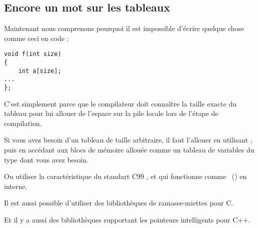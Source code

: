 \subsection{Encore un mot sur les tableaux}


Maintenant nous comprenons pourquoi il est impossible d'écrire quelque chose comme
ceci en code \CCpp:

\begin{lstlisting}[style=customc]
void f(int size)
{
    int a[size];
...
};
\end{lstlisting}


C'est simplement parce que le compilateur doit connaître la taille exacte du tableau
pour lui allouer de l'espace sur la pile locale lors de l'étape de compilation.


Si vous avez besoin d'un tableau de taille arbitraire, il faut l'allouer en utilisant
, puis en accédant aux blocs de mémoire allouée comme un tableau de
variables du type dont vous avez besoin.


Ou utiliser la caractéristique du standart C99 ,
et qui fonctionne comme ~() en interne.


Il est aussi possible d'utiliser des bibliothèques de ramasse-miettes pour C.

Et il y a aussi des bibliothèques supportant les pointeurs intelligents pour C++.


